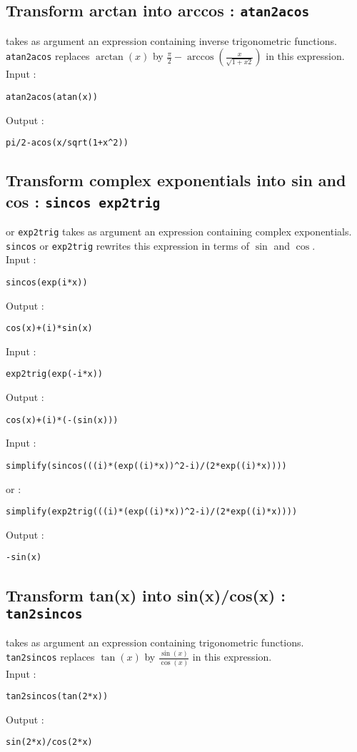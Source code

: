 \documentclass[a4paper,11pt]{book}
\begin{document}
\subsection{Transform arctan into arccos : {\tt atan2acos}}
 takes as argument an expression containing 
inverse trigonometric functions.\\
{\tt atan2acos} replaces $\arctan(x)$ by 
$\displaystyle \frac{\pi}{2}-\arccos(\frac{x}{\sqrt{1+x2}})$ 
in this expression.\\
Input :
\begin{center}{\tt atan2acos(atan(x))}\end{center}
Output :
\begin{center}{\tt pi/2-acos(x/sqrt(1+x\verb|^|2))}\end{center}

\subsection{Transform complex exponentials into sin and cos : {\tt sincos exp2trig}}
  or {\tt exp2trig} takes as argument an expression 
containing complex exponentials.\\
{\tt sincos} or {\tt exp2trig} rewrites this expression in terms of  
$\sin$ and  $\cos$.\\
Input :
\begin{center}{\tt sincos(exp(i*x))}\end{center}
Output :
\begin{center}{\tt cos(x)+(i)*sin(x)}\end{center}
Input :
\begin{center}{\tt exp2trig(exp(-i*x))}\end{center}
Output :
\begin{center}{\tt cos(x)+(i)*(-(sin(x)))}\end{center}
Input :
\begin{center}{\tt simplify(sincos(((i)*(exp((i)*x))\verb|^|2-i)/(2*exp((i)*x))))}\end{center}
or :
\begin{center}{\tt simplify(exp2trig(((i)*(exp((i)*x))\verb|^|2-i)/(2*exp((i)*x))))}\end{center}
Output :
\begin{center}{\tt -sin(x)}\end{center}

\subsection{Transform tan(x) into sin(x)/cos(x) : {\tt tan2sincos}}
 takes as argument an expression containing 
trigonometric functions.\\
{\tt tan2sincos} replaces $\tan(x)$ by
 $\displaystyle \frac{\sin(x)}{\cos(x)}$ in this expression.\\
Input :
\begin{center}{\tt tan2sincos(tan(2*x))}\end{center}
Output :
\begin{center}{\tt sin(2*x)/cos(2*x)}\end{center}
\end{document}

